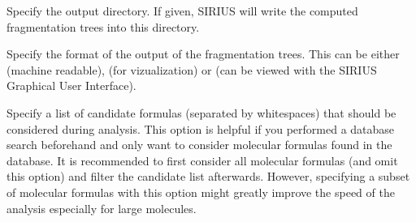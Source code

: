 \documentclass[letterpaper,10pt,openany,oneside]{sphinxmanual}
\begin{document}

\begin{fulllineitems}
\label{commandline:cmdoption-o}
Specify the output directory. If given, SIRIUS will write the computed
fragmentation trees into this directory.

\end{fulllineitems}


\begin{fulllineitems}
\label{commandline:cmdoption-O}
Specify the format of the output of the fragmentation trees. This can be either  (machine readable),  (for vizualization) or  (can be viewed with the SIRIUS Graphical User Interface).

\end{fulllineitems}


\begin{fulllineitems}
\label{commandline:cmdoption-f}
Specify a list of candidate formulas (separated by whitespaces) that should be considered during analysis. This option is helpful if you performed a database search beforehand and only want to consider molecular formulas found in the database. It is recommended to first consider all molecular formulas (and omit this option) and filter the candidate list afterwards. However, specifying a subset of molecular formulas with this option might greatly improve the speed of the analysis especially for large molecules.

\end{fulllineitems}
\end{document}
